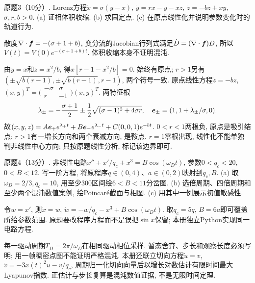 \begin{exercise}
原题3（10分）. Lorenz方程$\dot x=\sigma(y-x)$, $\dot y=rx-y-xz$, $\dot z=-bz+xy$, $\sigma,r,b>0$. (a) 证相体积收缩. (b) 求固定点. (c) 在原点线性化并说明参数变化时的轨道行为.
\end{exercise}
\begin{solution}
散度$\nabla\cdot\boldsymbol{f}=-(\sigma+1+b)$, 变分流的Jacobian行列式满足$\dot D=(\nabla\cdot\boldsymbol{f})D$, 所以$V(t)=V(0)e^{-(\sigma+1+b)t}$. 体积收缩本身不证明混沌.

由$y=x$和$z=x^2/b$, 得$x[r-1-x^2/b]=0$. 始终有原点; $r>1$另有$(\pm\sqrt{b(r-1)},\pm\sqrt{b(r-1)},r-1)$, 两个符号一致. 原点线性方程$\dot z=-bz$, $(\dot x,\dot y)^T=\bigl(\begin{smallmatrix}-\sigma&\sigma\\r&-1\end{smallmatrix}\bigr)(x,y)^T$. 两特征根
\[
\lambda_\pm=-\frac{\sigma+1}{2}
\pm\frac12\sqrt{(\sigma-1)^2+4\sigma r},
\quad\boldsymbol{e}_\pm=(1,1+\lambda_\pm/\sigma,0).
\]
故$(x,y,z)=A\boldsymbol{e}_+e^{\lambda_+t}+B\boldsymbol{e}_-e^{\lambda_-t}+C(0,0,1)e^{-bt}$. $0<r<1$两根负, 原点是吸引结点; $r>1$有一增长方向和两个衰减方向, 是鞍点. $r=1$零根出现, 线性化不能单独判非线性中心方向; 只按原题线性分析, 标记该边界即可.
\end{solution}

\begin{exercise}
原题4（13分）. 非线性电路$x''+x'/q_c+x^3=B\cos(\omega_Dt)$, 参数$0<q_c<20$, $0<B<12$. 写一阶方程, 将原程序$q\in(0,4)$、$a\in(0,2)$映射到$q_c,B$. (a) 取$\omega_D=2/3,q_c=10$, 用至少300区间绘$6<B<11$分岔图. (b) 选倍周期、四倍周期和至少两个混沌数值案例, 绘Poincaré截面与相图. (c) 用其中一例展示初值敏感性.
\end{exercise}
\begin{solution}
令$w=x'$, 则$\dot x=w$, $\dot w=-w/q_c-x^3+B\cos(\omega_Dt)$. 取$q_c=5q$, $B=6a$即可覆盖所给参数范围. 原题要改程序方程而不是误把$\sin x$保留; 本册独立Python实现同一电路方程.

每一驱动周期$T_D=2\pi/\omega_D$在相同驱动相位采样. 暂态舍弃、步长和观察长度必须写明; 用一帧稠密点图不能证明严格混沌. 本册还联立切向方程$\dot u=v$, $\dot v=-3x(t)^2u-v/q_c$, 周期归一化切向向量后以增长对数估计有限时间最大Lyapunov指数. 正估计与步长复算是混沌数值证据, 不是无限时间定理.

\end{solution}


